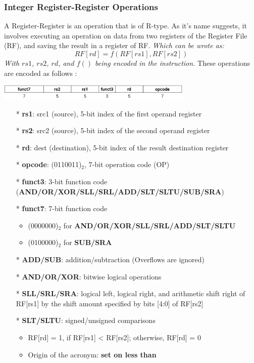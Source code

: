 \documentclass[12pt,openany]{book}
\begin{document}
\subsubsection{Integer Register-Register Operations}
A Register-Register is an operation that is of R-type. As it's name suggests, it involves executing an operation on data from two registers of the Register File (RF), and saving the result in a register of RF. \newline 
\textit{Which can be wrote as:}
$$RF[rd] = f(RF[rs1], RF[rs2])$$
\textit{With $rs1$, $rs2$, $rd$, and $f()$ being encoded in the instruction.}\newline
These operations are encoded as follows :\newline
\begin{center}
	\includegraphics[width=0.7\textwidth]{circuits/20.1.2.png}
\end{center}
\begin{itemize}
    \item[*] \textbf{rs1}: src1 (source), 5-bit index of the first operand register
    \item[*] \textbf{rs2}: src2 (source), 5-bit index of the second operand register
    \item[*] \textbf{rd}: dest (destination), 5-bit index of the result destination register
    \item[*] \textbf{opcode}: (0110011)$_2$, 7-bit operation code (OP)
    \item[*] \textbf{funct3}: 3-bit function code (\textbf{AND/OR/XOR/SLL/SRL/ADD/SLT/SLTU/SUB/SRA})
    \item[*] \textbf{funct7}: 7-bit function code
    \begin{itemize}
        \item (0000000)$_2$ for \textbf{AND/OR/XOR/SLL/SRL/ADD/SLT/SLTU}
        \item (0100000)$_2$ for \textbf{SUB/SRA}
    \end{itemize}
    \item[*] \textbf{ADD/SUB}: addition/subtraction (Overflows are ignored)
    \item[*] \textbf{AND/OR/XOR}: bitwise logical operations
    \item[*] \textbf{SLL/SRL/SRA}: logical left, logical right, and arithmetic shift right of RF[rs1] by the shift amount specified by bits [4:0] of RF[rs2]
    \item[*] \textbf{SLT/SLTU}: signed/unsigned comparisons
    \begin{itemize}
        \item RF[rd] = 1, if RF[rs1] < RF[rs2]; otherwise, RF[rd] = 0
        \item Origin of the acronym: \textbf{set on less than}
    \end{itemize}
\end{itemize}
\end{document}
